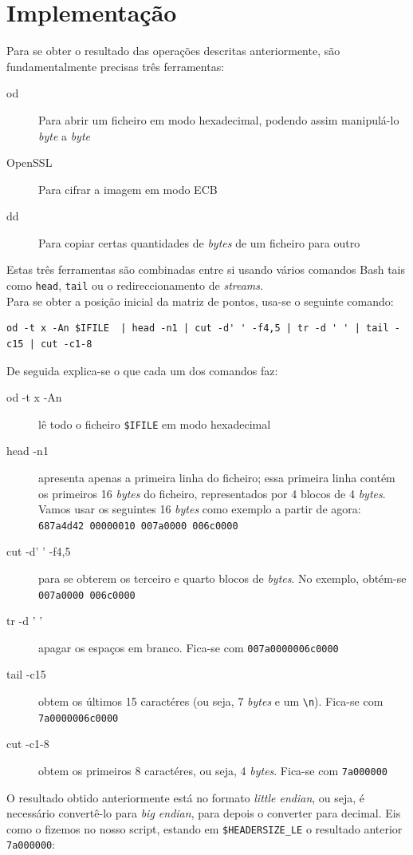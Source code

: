 \section{Implementação}
Para se obter o resultado das operações descritas anteriormente, são fundamentalmente precisas três ferramentas:
\begin{description}
  \item[od] Para abrir um ficheiro em modo hexadecimal, podendo assim manipulá-lo \textit{byte} a \textit{byte}
  \item[OpenSSL] Para cifrar a imagem em modo ECB
  \item[dd] Para copiar certas quantidades de \textit{bytes} de um ficheiro para outro
\end{description}
Estas três ferramentas são combinadas entre si usando vários comandos \textsf{Bash} tais como \verb|head|, \verb|tail| ou o redireccionamento de \textit{streams}.\\
Para se obter a posição inicial da matriz de pontos, usa-se o seguinte comando:
\begin{lstlisting}[style=Bash]
od -t x -An $IFILE  | head -n1 | cut -d' ' -f4,5 | tr -d ' ' | tail -c15 | cut -c1-8
\end{lstlisting}
De seguida explica-se o que cada um dos comandos faz:
\begin{description}
  \item[od -t x -An] lê todo o ficheiro \verb|$IFILE| em modo hexadecimal
  \item[head -n1] apresenta apenas a primeira linha do ficheiro; essa primeira linha contém os primeiros 16 \textit{bytes} do ficheiro, representados por 4 blocos de 4 \textit{bytes}. Vamos usar os seguintes 16 \textit{bytes} como exemplo a partir de agora: \verb|687a4d42 00000010 007a0000 006c0000|
  \item[cut -d' ' -f4,5] para se obterem os terceiro e quarto blocos de \textit{bytes}. No exemplo, obtém-se \verb|007a0000 006c0000|
  \item[tr -d ' '] apagar os espaços em branco. Fica-se com \verb|007a0000006c0000|
  \item[tail -c15] obtem os últimos 15 caractéres (ou seja, 7 \textit{bytes} e um \verb|\n|). Fica-se com \verb|7a0000006c0000|
  \item[cut -c1-8] obtem os primeiros 8 caractéres, ou seja, 4 \textit{bytes}. Fica-se com \verb|7a000000|
\end{description}
O resultado obtido anteriormente está no formato \textit{little endian}, ou seja, é necessário convertê-lo para \textit{big endian}, para depois o converter para decimal. Eis como o fizemos no nosso script, estando em \verb|$HEADERSIZE_LE| o resultado anterior \verb|7a000000|:
